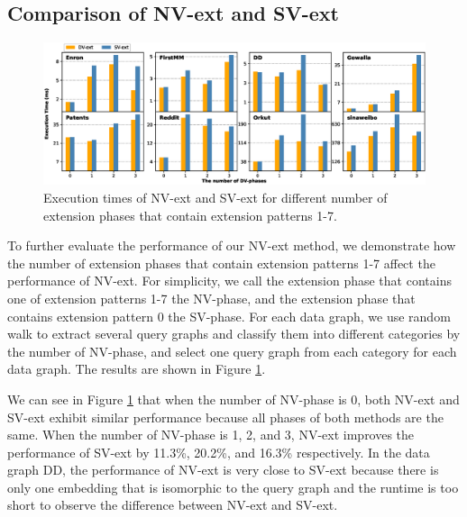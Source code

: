 \subsection{Comparison of NV-ext and SV-ext} \label{sec:comparesv}
\begin{figure}
\centering
\includegraphics[width=\textwidth]{./figure/compareSV.eps}
\caption{Execution times of NV-ext and SV-ext for different number of extension phases that contain extension patterns 1-7.}	
\label{fig:compareSV}
\end{figure}
To further evaluate the performance of our NV-ext method, we demonstrate how the number of extension phases that contain extension patterns 1-7 affect the performance of NV-ext. For simplicity, we call the extension phase that contains one of extension patterns 1-7 the NV-phase, and the extension phase that contains extension pattern 0 the SV-phase. For each data graph, we use random walk to extract several query graphs and classify them into different categories by the number of NV-phase, and select one query graph from each category for each data graph. The results are shown in Figure \ref{fig:compareSV}.

We can see in Figure \ref{fig:compareSV} that when the number of NV-phase is 0, both NV-ext and SV-ext exhibit similar performance because all phases of both methods are the same. When the number of NV-phase is 1, 2, and 3, NV-ext improves the performance of SV-ext by 11.3\%, 20.2\%, and 16.3\% respectively. In the data graph DD, the performance of NV-ext is very close to SV-ext because there is only one embedding that is isomorphic to the query graph and the runtime is too short to observe the difference between NV-ext and SV-ext.